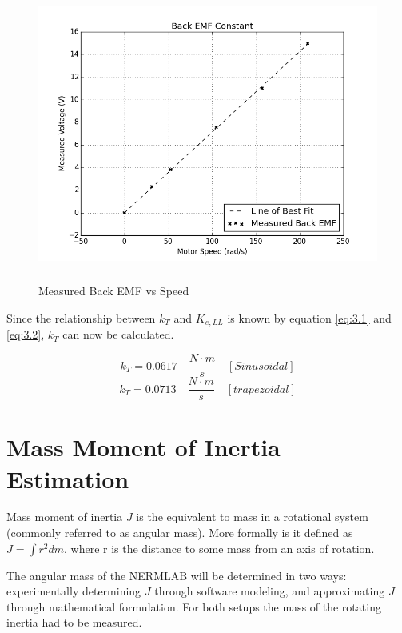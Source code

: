 \begin{figure}[htb]%
\begin{center}
    \includegraphics[height=3.8in]{figures/back_emf_plot.png}

    \caption[Measured Back EMF vs Speed]{Measured Back EMF vs Speed}

    \label{back_emf_plot}
\end{center}
\end{figure}

Since the relationship between \(k_T\) and \(K_{e,LL}\) is known by equation \ref{eq:3.1} and \ref{eq:3.2}, \(k_T\) can now be calculated.
\begin{tcolorbox}[
    standard jigsaw,
    opacityback=0]
\[k_T = 0.0617 \quad \frac{N \cdot m}{s} \quad [Sinusoidal]\]
\[k_T =  0.0713 \quad  \frac{N \cdot m}{s} \quad [trapezoidal]\]
\end{tcolorbox}

\newpage
\section{Mass Moment of Inertia Estimation}
Mass moment of inertia \(J\) is the equivalent to mass in a rotational system (commonly referred to as angular mass). More formally is it defined as \(J = \int r^2 dm\), where r is the distance to some mass from an axis of rotation.

The angular mass of the NERMLAB will be determined in two ways: experimentally determining \(J\) through software modeling, and approximating \(J\) through mathematical formulation. For both setups the mass of the rotating inertia had to be measured.

